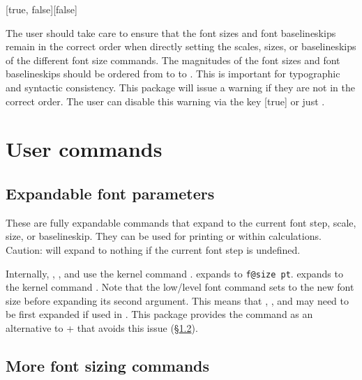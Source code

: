 \documentclass{beery}
\begin{document}
[true, false][false]
\KeepNextPar*

The user should take care to ensure that the font sizes and font baselineskips remain in the correct order when directly setting the scales, sizes, or baselineskips of the different font size commands.
The magnitudes of the font sizes and font baselineskips should be ordered from  to  to .
This is important for typographic and syntactic consistency.
This package will issue a warning if they are not in the correct order.
The user can disable this warning via the key [true] or just .


\section{User commands}
\label{sec:usercommands}

\subsection{Expandable font parameters}
\label{subsec:fontparameters}

\nopagebreak\newline
{}
\newline
{}
\nopagebreak\newline
{}

These are fully expandable commands that expand to the current font step, scale, size, or baselineskip.
They can be used for printing or within calculations.
Caution:  will expand to nothing if the current font step is undefined.

Internally, , , and  use the kernel command .
 expands to \texttt{f@size pt}.
 expands to the kernel command .
Note that the low\-/level font command  sets  to the new font size before expanding its second argument.
This means that , , and  may need to be first expanded if used in .
This package provides the command  as an alternative to  +  that avoids this issue (\S\ref{subsec:fontsize}).

\subsection{More font sizing commands}
\label{subsec:fontsize}
\end{document}
